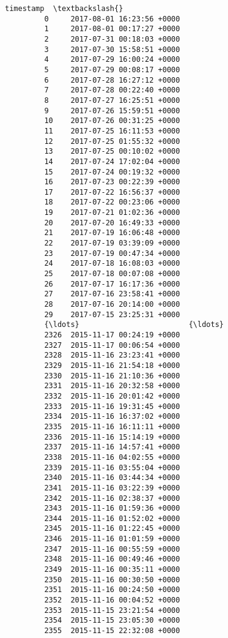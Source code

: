 \documentclass[11pt]{article}
\begin{document}
\begin{Verbatim}[commandchars=\\\{\}]
                               timestamp  \textbackslash{}
         0     2017-08-01 16:23:56 +0000   
         1     2017-08-01 00:17:27 +0000   
         2     2017-07-31 00:18:03 +0000   
         3     2017-07-30 15:58:51 +0000   
         4     2017-07-29 16:00:24 +0000   
         5     2017-07-29 00:08:17 +0000   
         6     2017-07-28 16:27:12 +0000   
         7     2017-07-28 00:22:40 +0000   
         8     2017-07-27 16:25:51 +0000   
         9     2017-07-26 15:59:51 +0000   
         10    2017-07-26 00:31:25 +0000   
         11    2017-07-25 16:11:53 +0000   
         12    2017-07-25 01:55:32 +0000   
         13    2017-07-25 00:10:02 +0000   
         14    2017-07-24 17:02:04 +0000   
         15    2017-07-24 00:19:32 +0000   
         16    2017-07-23 00:22:39 +0000   
         17    2017-07-22 16:56:37 +0000   
         18    2017-07-22 00:23:06 +0000   
         19    2017-07-21 01:02:36 +0000   
         20    2017-07-20 16:49:33 +0000   
         21    2017-07-19 16:06:48 +0000   
         22    2017-07-19 03:39:09 +0000   
         23    2017-07-19 00:47:34 +0000   
         24    2017-07-18 16:08:03 +0000   
         25    2017-07-18 00:07:08 +0000   
         26    2017-07-17 16:17:36 +0000   
         27    2017-07-16 23:58:41 +0000   
         28    2017-07-16 20:14:00 +0000   
         29    2017-07-15 23:25:31 +0000   
         {\ldots}                         {\ldots}   
         2326  2015-11-17 00:24:19 +0000   
         2327  2015-11-17 00:06:54 +0000   
         2328  2015-11-16 23:23:41 +0000   
         2329  2015-11-16 21:54:18 +0000   
         2330  2015-11-16 21:10:36 +0000   
         2331  2015-11-16 20:32:58 +0000   
         2332  2015-11-16 20:01:42 +0000   
         2333  2015-11-16 19:31:45 +0000   
         2334  2015-11-16 16:37:02 +0000   
         2335  2015-11-16 16:11:11 +0000   
         2336  2015-11-16 15:14:19 +0000   
         2337  2015-11-16 14:57:41 +0000   
         2338  2015-11-16 04:02:55 +0000   
         2339  2015-11-16 03:55:04 +0000   
         2340  2015-11-16 03:44:34 +0000   
         2341  2015-11-16 03:22:39 +0000   
         2342  2015-11-16 02:38:37 +0000   
         2343  2015-11-16 01:59:36 +0000   
         2344  2015-11-16 01:52:02 +0000   
         2345  2015-11-16 01:22:45 +0000   
         2346  2015-11-16 01:01:59 +0000   
         2347  2015-11-16 00:55:59 +0000   
         2348  2015-11-16 00:49:46 +0000   
         2349  2015-11-16 00:35:11 +0000   
         2350  2015-11-16 00:30:50 +0000   
         2351  2015-11-16 00:24:50 +0000   
         2352  2015-11-16 00:04:52 +0000   
         2353  2015-11-15 23:21:54 +0000   
         2354  2015-11-15 23:05:30 +0000   
         2355  2015-11-15 22:32:08 +0000   
         

\end{Verbatim}
\end{document}
